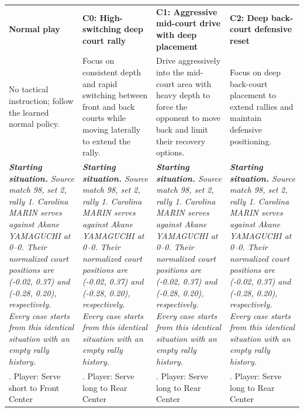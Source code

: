 \begin{table}[t]
\raggedright
\scriptsize
\renewcommand{\arraystretch}{1.05}
\begin{tabularx}{\textwidth}{*{4}{>{\raggedright\arraybackslash}X}}
\toprule
\textcolor{normalgray}{\textbf{\large Normal play}} & \textcolor{switchblue}{\textbf{\large C0: High-switching deep court rally}} & \textcolor{attackorange}{\textbf{\large C1: Aggressive mid-court drive with deep placement}} & \textcolor{resetgreen}{\textbf{\large C2: Deep back-court defensive reset}} \\
\addlinespace[2pt]
No tactical instruction; follow the learned normal policy. & Focus on consistent depth and rapid switching between front and back courts while moving laterally to extend the rally. & Drive aggressively into the mid-court area with heavy depth to force the opponent to move back and limit their recovery options. & Focus on deep back-court placement to extend rallies and maintain defensive positioning. \\
\addlinespace[2pt]
\textit{\textbf{Starting situation.} Source match 98, set 2, rally 1. Carolina MARIN serves against Akane YAMAGUCHI at 0--0. Their normalized court positions are (-0.02, 0.37) and (-0.28, 0.20), respectively. Every case starts from this identical situation with an empty rally history.} & \textit{\textbf{Starting situation.} Source match 98, set 2, rally 1. Carolina MARIN serves against Akane YAMAGUCHI at 0--0. Their normalized court positions are (-0.02, 0.37) and (-0.28, 0.20), respectively. Every case starts from this identical situation with an empty rally history.} & \textit{\textbf{Starting situation.} Source match 98, set 2, rally 1. Carolina MARIN serves against Akane YAMAGUCHI at 0--0. Their normalized court positions are (-0.02, 0.37) and (-0.28, 0.20), respectively. Every case starts from this identical situation with an empty rally history.} & \textit{\textbf{Starting situation.} Source match 98, set 2, rally 1. Carolina MARIN serves against Akane YAMAGUCHI at 0--0. Their normalized court positions are (-0.02, 0.37) and (-0.28, 0.20), respectively. Every case starts from this identical situation with an empty rally history.} \\
\midrule
1. Player: Serve short to Front Center & 1. Player: Serve long to Rear Center & 1. Player: Serve long to Rear Center & 1. Player: Serve long to Rear Center \\

\end{tabularx}
\end{table}
